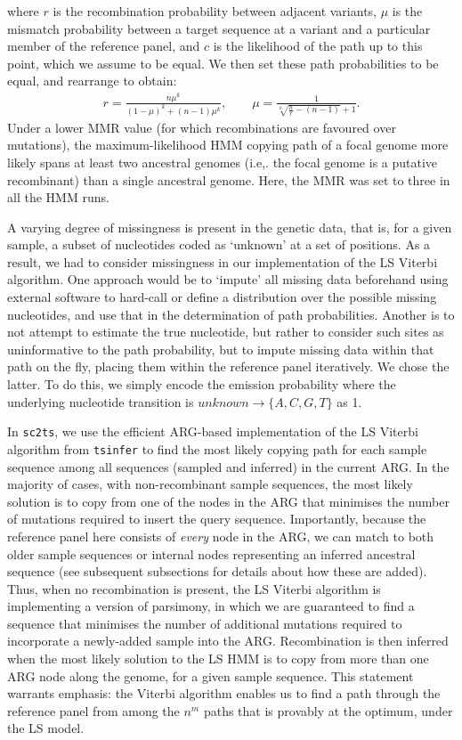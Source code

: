 \documentclass{article}
\begin{document}
where $r$ is the recombination probability between adjacent variants, $\mu$ is the mismatch
probability between a target sequence at a variant and a particular member of the reference
panel, and $c$ is the likelihood of the path up to this point, which we assume to be equal.
We then set these path probabilities to be equal, and rearrange to obtain:
\begin{align*}
r = \frac{n\mu^k}{\left(1-\mu\right)^k + \left(n-1\right)\mu^k}, \quad\quad
\mu = \frac{1}{\sqrt[k]{\frac{n}{r} - (n-1)} + 1}.
\end{align*}
Under a lower MMR value (for which recombinations are favoured over mutations), the maximum-likelihood HMM copying path of a
focal genome more likely spans at least two ancestral genomes (i.e,. the focal
genome is a putative recombinant) than a single ancestral genome. Here, the MMR
was set to three in all the HMM runs.

A varying degree of missingness is present in the genetic data, that is, for a given sample,
a subset of nucleotides coded as `unknown' at a set of positions. As a result, we had to
consider missingness in our implementation of the LS Viterbi algorithm. One approach would be to `impute'
all missing data beforehand using external software to hard-call or define a
distribution over the possible missing nucleotides, and use that in the determination of path
probabilities. Another is to not attempt to estimate the true nucleotide, but rather to
consider such sites as uninformative to the path probability, but to impute missing data
within that path on the fly, placing them within the reference panel iteratively. We chose the latter. To do this, we simply encode the emission
probability where the underlying nucleotide transition is $\mathit{unknown}\rightarrow \{A,C,G,T\}$ as 1.

In \texttt{sc2ts}, we use the efficient ARG-based implementation of the
LS Viterbi algorithm from \texttt{tsinfer} \citep{Kelleher2019-ba} to find
the most likely copying path for each sample sequence
among all sequences (sampled and inferred) in the current ARG.
In the majority of cases, with non-recombinant sample sequences,
the most likely solution is to copy from one
of the nodes in the ARG that minimises the number of mutations required
to insert the query sequence. Importantly, because the reference panel here consists of
\emph{every} node in the ARG, we can match to both older sample
sequences or internal nodes representing an inferred ancestral sequence
(see subsequent subsections for details about how these are added).
Thus, when no recombination is present, the LS Viterbi algorithm is
implementing a version of parsimony, in which we are guaranteed to
find a sequence that minimises the number of additional mutations required
to incorporate a newly-added sample into the ARG.
Recombination is then inferred when the most likely solution to the LS
HMM is to copy from more than one ARG node along the genome, for a
given sample sequence. This statement warrants emphasis: the Viterbi algorithm enables us to find a path through the reference panel from among the $n^m$ paths that is provably at the optimum, under the LS model.
\end{document}
